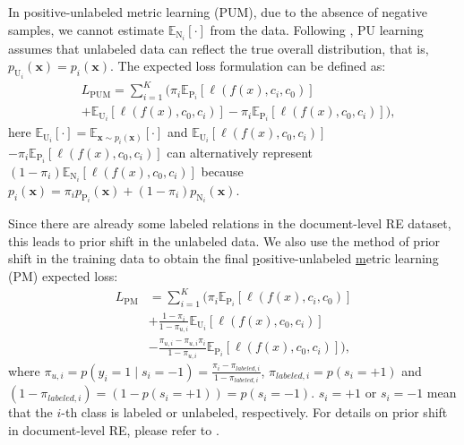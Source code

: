 \documentclass[11pt]{article}
\begin{document}
In positive-unlabeled metric learning (PUM), due to the absence of negative samples, we cannot  estimate $\mathbb{E}_{\mathrm{N}_{i}}[\cdot]$ from the data. Following \citep{NIPS2014_35051070}, PU learning assumes that unlabeled data can reflect the true overall distribution, that is, $p_{\mathrm{U}_{i}}(\boldsymbol{x})=p_{i}(\boldsymbol{x})$. The expected loss formulation can be defined as:
\begin{equation}
\begin{aligned}\label{eq5}
&L_{\mathrm{PUM}}=\sum_{i=1}^{K}(\pi_{i} \mathbb{E}_{\mathrm{P}_{i}}[\ell(f(x), c_{i}, c_{0})]\\&+\mathbb{E}_{\mathrm{U}_{i}}[\ell(f(x), c_{0}, c_{i})]-\pi_{i} \mathbb{E}_{\mathrm{P}_{i}}[\ell(f(x), c_{0}, c_{i})]),
\end{aligned}
\end{equation}
here $\mathbb{E}_{\mathrm{U}_{i}}[\cdot]=\mathbb{E}_{\boldsymbol{x} \sim p_{i}(\boldsymbol{x})}[\cdot]$ and $\mathbb{E}_{\mathrm{U}_{i}}[\ell(f(x), c_{0}, c_{i})]$ $-\pi_{i} \mathbb{E}_{\mathrm{P}_{i}}[\ell(f(x), c_{0}, c_{i})]$ can alternatively represent $(1-\pi_{i})\mathbb{E}_{\mathrm{N}_{i}}[\ell(f(x), c_{0}, c_{i})]$ because $p_{i}(\boldsymbol{x})=
\pi_{i}p_{\mathrm{P}_{i}}(\boldsymbol{x})+(1-\pi_{i})p_{\mathrm{N}_{i}}(\boldsymbol{x})$.

Since there are already some labeled relations in the document-level RE dataset, this leads to prior shift in the unlabeled data. We also use the method of prior shift in the training data to obtain the final \underline{p}ositive-unlabeled \underline{m}etric learning (PM) expected loss:
\begin{equation}
\begin{aligned}\label{eq6}
L_{\mathrm{PM}}&=\sum_{i=1}^{K}(\pi_{i} \mathbb{E}_{\mathrm{P}_{i}}[ \ell(f(x), c_{i}, c_{0})] \\
&+\frac{1-\pi_{i}}{1-\pi_{u,i}} \mathbb{E}_{\mathrm{U}_{i}}[\ell(f(x), c_{0}, c_{i})] \\
&-\frac{\pi_{u,i}-\pi_{u,i} \pi_{i}}{1-\pi_{u,i}}\mathbb{E}_{\mathrm{P}_{i}}[\ell(f(x), c_{0}, c_{i})]),
\end{aligned}
\end{equation}
where $\pi_{u,i}=p(y_{i}=1 \mid s_{i}=-1)=\frac{\pi_{i}-\pi_{labeled,i}}{1-\pi_{labeled,i}}$, $\pi_{labeled,i}=p(s_{i}=+1)$ and $(1-\pi_{labeled,i})=(1-p(s_{i}=+1))=p(s_{i}=-1)$. $s_{i}=+1$ or $s_{i}=-1$ mean that the $i$-th class is labeled or unlabeled, respectively. For details on prior shift in document-level RE, please refer to \citep{wang2022unified}.
\end{document}
